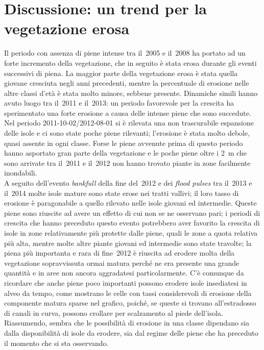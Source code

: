\section{Discussione: un trend per la vegetazione erosa}
Il periodo con assenza di piene intense tra il~2005 e il~2008 ha portato ad un forte incremento della vegetazione, che in seguito è stata erosa durante gli eventi successivi di piena.
La maggior parte della vegetazione erosa è stata quella giovane cresciuta negli anni precedenti, mentre la percentuale di erosione nelle altre classi d'età è stata molto minore, sebbene presente.
Dinamiche simili hanno avuto luogo tra il~2011 e il~2013: un periodo favorevole per la crescita ha sperimentato una forte erosione a causa delle intense piene che sono succedute.
\\
Nel periodo 2011-10-02/2012-08-01 si è rilevata una non trascurabile espansione delle isole e ci sono state poche piene rilevanti; l'erosione è stata molto debole, quasi assente in ogni classe. Forse le piene avvenute prima di questo periodo hanno asportato gran parte della vegetazione e le poche piene oltre i \SI{2}{\m} che sono arrivate tra il~2011 e il~2012 non hanno trovato piante in zone facilmente inondabili.
\\
A seguito dell'evento \emph{bankfull} della fine del~2012 e dei \emph{flood pulses} tra il~2013 e il~2014 molte isole mature sono state erose nei tratti vallivi; il loro tasso di erosione è paragonabile a quello rilevato nelle isole giovani ed intermedie. Queste piene sono riuscite ad avere un effetto di cui non se ne osservano pari; i periodi di crescita che hanno preceduto questo evento potrebbero aver favorito la crescita di isole in zone relativamente più protette dalle piene, quali le zone a quota relativa più alta, mentre molte altre piante giovani ed intermedie sono state travolte; la piena più importanta e rara di fine~2012 è riuscita ad erodere molta della vegetazione sopravvissuta ormai matura perché ne era presente una grande quantità e in aree non ancora aggradatesi particolarmente.
C'è comunque da ricordare che anche piene poco importanti possono erodere isole insediatesi in alveo da tempo, come mostrano le celle con tassi considerevoli di erosione della componente matura sparse nel grafico, poiché, se queste si trovano all'estradosso di canali in curva, possono crollare per scalzamento al piede dell'isola.
\\
Riassumendo, sembra che le possibilità di erosione in una classe dipendano sia dalla disponibilità di isole da erodere, sia dal regime delle piene che ha preceduto il momento che si sta osservando.

